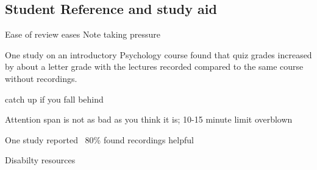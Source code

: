 \documentclass[sigconf]{acmart}
\begin{document}
\subsection{Student Reference and study aid}


Ease of review
eases Note taking pressure


One study \cite{shimoff2001effects}  on an introductory Psychology course found that quiz grades increased by about a letter grade with the lectures recorded compared to the same course without recordings.

catch up if you fall behind \cite{young2008lectures}

Attention span is not as bad as you think it is; 10-15 minute limit overblown \cite{bradbury2016attention} \cite{wilson2007attention}

One study reported ~80\% found recordings helpful \cite{maynor2013student}


Disabilty resources
\end{document}
